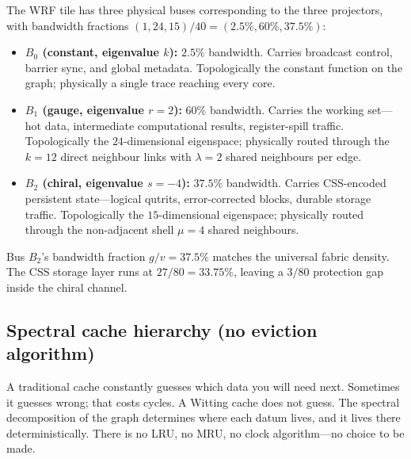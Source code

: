 \documentclass[11pt,letterpaper]{article}
\theoremstyle{remark}
\begin{document}
The WRF tile has three physical buses corresponding to the three projectors, with
bandwidth fractions $(1, 24, 15)/40 = (2.5\%, 60\%, 37.5\%)$:
\begin{itemize}[leftmargin=2em,nosep]
\item \textbf{$B_0$ (constant, eigenvalue $k$):} $2.5\%$ bandwidth. Carries broadcast
control, barrier sync, and global metadata. Topologically the constant function on the
graph; physically a single trace reaching every core.
\item \textbf{$B_1$ (gauge, eigenvalue $r = 2$):} $60\%$ bandwidth. Carries the working
set---hot data, intermediate computational results, register-spill traffic. Topologically
the $24$-dimensional eigenspace; physically routed through the $k = 12$ direct neighbour
links with $\lambda = 2$ shared neighbours per edge.
\item \textbf{$B_2$ (chiral, eigenvalue $s = -4$):} $37.5\%$ bandwidth. Carries
CSS-encoded persistent state---logical qutrits, error-corrected blocks, durable storage
traffic. Topologically the $15$-dimensional eigenspace; physically routed through the
non-adjacent shell $\mu = 4$ shared neighbours.
\end{itemize}
Bus $B_2$'s bandwidth fraction $g/v = 37.5\%$ matches the universal fabric density. The
CSS storage layer runs at $27/80 = 33.75\%$, leaving a $3/80$ protection gap inside the
chiral channel.

\subsection{Spectral cache hierarchy (no eviction algorithm)}

\begin{intuition}
A traditional cache constantly guesses which data you will need next. Sometimes it
guesses wrong; that costs cycles. A Witting cache does not guess. The spectral
decomposition of the graph determines where each datum lives, and it lives there
deterministically. There is no LRU, no MRU, no clock algorithm---no choice to be made.
\end{intuition}
\end{document}
